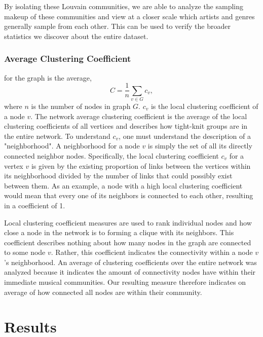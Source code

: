 \documentclass[pageno]{jpaper}
\begin{document}
By isolating these Louvain communities, we are able to analyze the sampling makeup of these communities and view at a closer scale which artists and genres generally sample from each other. This can be used to verify the broader statistics we discover about the entire dataset. 
\subsubsection{Average Clustering Coefficient}
for the graph is the average, 
\begin{equation}
C = \frac{1}{n}\sum_{v \in G} c_v,
\end{equation} where $n$ is the number of nodes in graph $G$.  $c_v$ is the local clustering coefficient of a node $v$. The network average clustering coefficient is the average of the local clustering coefficients of all vertices and describes how tight-knit groups are in the entire network. 
To understand $c_v$, one must understand the description of a "neighborhood". A neighborhood for a node $v$ is simply the set of all its directly connected neighbor nodes. Specifically, the local clustering coefficient $c_v$ for a vertex $v$ is given by the existing proportion of links between the vertices within its neighborhood divided by the number of links that could possibly exist between them. As an example, a node with a high local clustering coefficient would mean that every one of its neighbors is connected to each other, resulting in a coefficient of 1. 

Local clustering coefficient measures are used to rank individual nodes and how close a node in the network is to forming a clique with its neighbors. This coefficient describes nothing about how many nodes in the graph are connected to some node $v$. Rather, this coefficient indicates the connectivity within a node $v$'s neighborhood. An average of clustering coefficients over the entire network was analyzed because it indicates the amount of connectivity nodes have within their immediate musical communities. Our resulting measure therefore indicates on average of how connected all nodes are within their community.
 
\section{Results}
\end{document}
